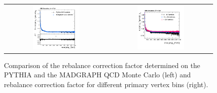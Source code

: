 \begin{figure}[!t]
  \centering
  \begin{tabular}{cc}
                \includegraphics[width=0.47\textwidth]{figures/RebalanceCorrectionFactors_DR53X_chsJets_TuneZ2star_withoutPUReweighting_pt10_vsRecoWithMadgraphComp.png} &
                \includegraphics[width=0.47\textwidth]{figures/RebalanceCorrectionFactors_DR53X_chsJets_TuneZ2star_withoutPUReweighting_pt10_vsRecoNVtxSplit.png}\\

  \end{tabular}
  \caption{Comparison of the rebalance correction factor determined on the PYTHIA and the MADGRAPH QCD Monte Carlo (left) and rebalance correction factor for different primary vertex bins (right).}
  \label{fig:qcd_rs_rebfactor}
\end{figure}

